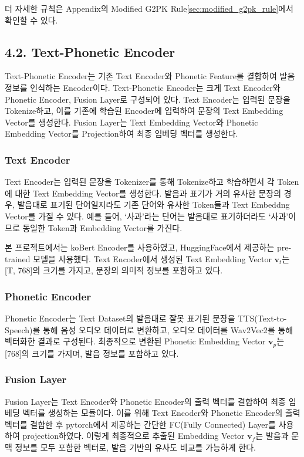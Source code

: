 \documentclass[letterpaper]{article} %
\begin{document}
더 자세한 규칙은 Appendix의 Modified G2PK Rule\ref{sec:modified_g2pk_rule}에서 확인할 수 있다.


\subsection{4.2. Text-Phonetic Encoder}
Text-Phonetic Encoder는 기존 Text Encoder와 Phonetic Feature를 결합하여 발음 정보를 인식하는 Encoder이다.
Text-Phonetic Encoder는 크게 Text Encoder와 Phonetic Encoder, Fusion Layer로 구성되어 있다. Text Encoder는 입력된 문장을 Tokenize하고, 이를 기존에 학습된 Encoder에 입력하여 문장의 Text Embedding Vector를 생성한다.
Fusion Layer는 Text Embedding Vector와 Phonetic Embedding Vector를 Projection하여 최종 임베딩 벡터를 생성한다.

\subsubsection{Text Encoder}
Text Encoder는 입력된 문장을 Tokenizer를 통해 Tokenize하고 학습하면서 각 Token에 대한 Text Embedding Vector를 생성한다.
발음과 표기가 거의 유사한 문장의 경우, 발음대로 표기된 단어일지라도 기존 단어와 유사한 Token들과 Text Embeddng Vector를 가질 수 있다.
예를 들어, `사과'라는 단어는 발음대로 표기하더라도 `사과'이므로 동일한 Token과 Embedding Vector를 가진다.

본 프로젝트에서는 koBert Encoder를 사용하였고, HuggingFace에서 제공하는 pre-trained 모델을 사용했다.
Text Encoder에서 생성된 Text Embedding Vector $\mathbf{v}_t$는 [T, 768]의 크기를 가지고, 문장의 의미적 정보를 포함하고 있다.


\subsubsection{Phonetic Encoder}
Phonetic Encoder는 Text Dataset의 발음대로 잘못 표기된 문장을 TTS(Text-to-Speech)를 통해 음성 오디오 데이터로 변환하고, 오디오 데이터를 Wav2Vec2를 통해 벡터화한 결과로 구성된다.
최종적으로 변환된 Phonetic Embedding Vector $\mathbf{v}_p$는 [768]의 크기를 가지며, 발음 정보를 포함하고 있다.


\subsubsection{Fusion Layer}
Fusion Layer는 Text Encoder와 Phonetic Encoder의 출력 벡터를 결합하여 최종 임베딩 벡터를 생성하는 모듈이다.
이를 위해 Text Encoder와 Phonetic Encoder의 출력 벡터를 결합한 후 pytorch에서 제공하는 간단한 FC(Fully Connected) Layer를 사용하여 projection하였다. 이렇게 최종적으로 추출된 Embedding Vector $\mathbf{v}_f$는 발음과 문맥 정보를 모두 포함한 벡터로, 발음 기반의 유사도 비교를 가능하게 한다.
\end{document}
